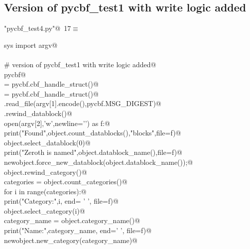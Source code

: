 \documentclass[10pt,a4paper,twoside,notitlepage]{article}
\begin{document}
\subsection{Version of pycbf\_test1 with write logic added}

\begin{flushleft} \small
\begin{minipage}{\linewidth}\label{scrap16}\raggedright\small
{} \verb@"pycbf_test4.py"@\nobreak\ {\footnotesize {17}}$\equiv$
\vspace{-1ex}
\begin{list}{}{} \item
\mbox{}\verb@from sys import argv@\\
\mbox{}\verb@@\\
\mbox{}\verb@# version of pycbf_test1 with write logic added@\\
\mbox{}\verb@import pycbf@\\
\mbox{}\verb@object = pycbf.cbf_handle_struct()@\\
\mbox{}\verb@newobject = pycbf.cbf_handle_struct()@\\
\mbox{}\verb@object.read_file(argv[1].encode(),pycbf.MSG_DIGEST)@\\
\mbox{}\verb@object.rewind_datablock()@\\
\mbox{}\verb@with open(argv[2],'w',newline='\n') as f:@\\
\mbox{}\verb@    print("Found",object.count_datablocks(),"blocks",file=f)@\\
\mbox{}\verb@    object.select_datablock(0)@\\
\mbox{}\verb@    print("Zeroth is named",object.datablock_name(),file=f)@\\
\mbox{}\verb@    newobject.force_new_datablock(object.datablock_name());@\\
\mbox{}\verb@    object.rewind_category()@\\
\mbox{}\verb@    categories = object.count_categories()@\\
\mbox{}\verb@    for i in range(categories):@\\
\mbox{}\verb@        print("Category:",i, end= ' ', file=f)@\\
\mbox{}\verb@        object.select_category(i)@\\
\mbox{}\verb@        category_name = object.category_name()@\\
\mbox{}\verb@        print("Name:",category_name, end=' ', file=f)@\\
\mbox{}\verb@        newobject.new_category(category_name)@\\

\end{list}
\end{minipage}
\end{flushleft}
\end{document}
